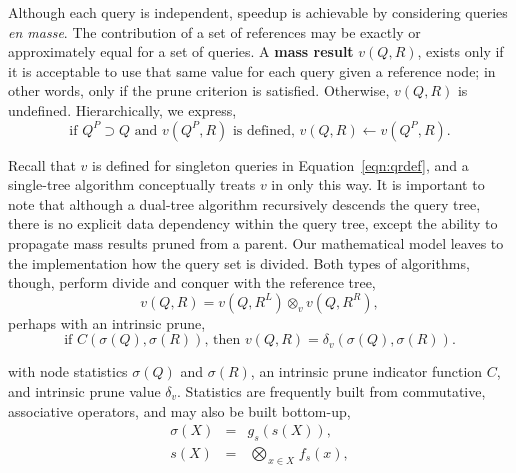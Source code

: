 \documentclass[twoside,leqno,twocolumn]{article}
\newcommand{\summary}{\delta}
\newcommand{\defterm}[1]{{\bf #1}}
\newcommand{\kdleft}[1]{#1^{\!L}}
\newcommand{\kdright}[1]{#1^{\!R}}
\newcommand{\kdparent}[1]{#1^{\!P}}
\newcommand{\nameOp}[2]{\mathop{#1\nolimits\!\!_{#2}}}
\newcommand{\nameop}[2]{#1_{\!#2}}
\newcommand{\myOp}[1]{\nameOp{\bigotimes}{#1}}
\newcommand{\myop}[1]{\nameop{\otimes}{#1}}
\newcommand{\letterqr}{v}
\newcommand{\opqr}{\myop{\letterqr}}
\newcommand{\letterqrv}{v}
\newcommand{\inqrv}{v}
\newcommand{\deltaqrv}{\summary_{\letterqrv}}
\newcommand{\canpruneqrv}{C}%
\newcommand{\letterstat}{s}
\newcommand{\outstat}{\sigma}
\newcommand{\instat}{s}
\newcommand{\Opstat}{\myOp{\letterstat}}
\newcommand{\fstat}{f_{\letterstat}}
\newcommand{\gstat}{g_{\letterstat}}
\begin{document}
Although each query is independent, speedup is achievable by considering queries {\it en masse}.
The contribution of a set of references may be exactly or approximately equal for a set of queries.
A \defterm{mass result} $\inqrv(Q, R)$, exists only if it is acceptable to use that same value for each query given a reference node; in other words, only if the prune criterion is satisfied.
Otherwise, $\inqrv(Q,R)$ is undefined.
Hierarchically, we express,
\begin{equation}
\text{if } \kdparent{Q} \supset Q \text{ and }\inqrv(\kdparent{Q}, R)\text{ is defined, } \inqrv(Q, R) \gets \inqrv(\kdparent{Q}, R).
\label{eqn:qrvparent}
\end{equation}

\noindent
Recall that $\inqrv$ is defined for singleton queries in Equation~\ref{eqn:qrdef}, and a single-tree algorithm conceptually treats $\inqrv$ in only this way.
It is important to note that although a dual-tree algorithm recursively descends the query tree, there is no explicit data dependency within the query tree, except the ability to propagate mass results pruned from a parent.
Our mathematical model leaves to the implementation how the query set is divided.
Both types of algorithms, though, perform divide and conquer with the reference tree,
\begin{equation}
\inqrv(Q, R) = \inqrv(Q, \kdleft{R}) \opqr \inqrv(Q, \kdright{R}),
\label{eqn:qrvcompose}
\end{equation}
\noindent perhaps with an intrinsic prune,
\begin{equation}
\text{if } \canpruneqrv(\outstat(Q), \outstat(R)) \text{, then } \inqrv(Q, R) = \deltaqrv(\outstat(Q), \outstat(R)).
\label{eqn:qrvprune}
\end{equation}

\noindent
with node statistics $\outstat(Q)$ and $\outstat(R)$, an intrinsic prune indicator function $\canpruneqrv$, and intrinsic prune value $\deltaqrv$.
Statistics are frequently built from commutative, associative operators, and may also be built bottom-up,
\begin{eqnarray}
\outstat(X) &=& \gstat(\instat(X)),
\\
\instat(X) &=& \Opstat_{x \in X} \fstat(x),
\label{eqn:defstat}
\end{eqnarray}
\end{document}
